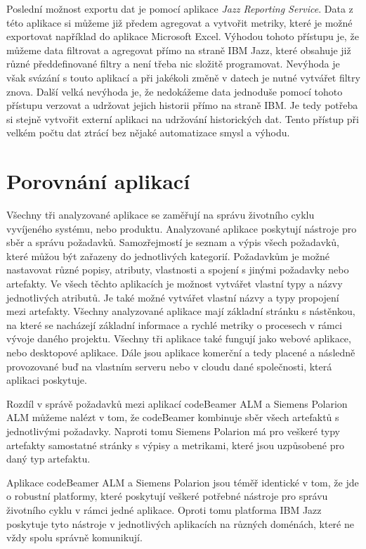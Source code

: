 \documentclass[czech,master]{diploma}
\begin{document}
Poslední možnost exportu dat je pomocí aplikace \textit{Jazz Reporting Service}. Data z této aplikace si můžeme již předem agregovat a vytvořit metriky, které je možné exportovat například do aplikace Microsoft Excel. Výhodou tohoto přístupu je, že můžeme data filtrovat a agregovat přímo na straně IBM Jazz, které obsahuje již různé předdefinované filtry a není třeba nic složitě programovat. Nevýhoda je však svázání s touto aplikací a při jakékoli změně v datech je nutné vytvářet filtry znova. Další velká nevýhoda je, že nedokážeme data jednoduše pomocí tohoto přístupu verzovat a udržovat jejich historii přímo na straně IBM. Je tedy potřeba si stejně vytvořit externí aplikaci na udržování historických dat. Tento přístup při velkém počtu dat ztrácí bez nějaké automatizace smysl a výhodu.

\section{Porovnání aplikací}
Všechny tři analyzované aplikace se zaměřují na správu životního cyklu vyvíjeného systému, nebo produktu. Analyzované aplikace poskytují nástroje pro sběr a správu požadavků. Samozřejmostí je seznam a výpis všech požadavků, které můžou být zařazeny do jednotlivých kategorií. Požadavkům je možné nastavovat různé popisy, atributy, vlastnosti a spojení s jinými požadavky nebo artefakty. Ve všech těchto aplikacích je možnost vytvářet vlastní typy a názvy jednotlivých atributů. Je také možné vytvářet vlastní názvy a typy propojení mezi artefakty. Všechny analyzované aplikace mají základní stránku s nástěnkou, na které se nacházejí základní informace a rychlé metriky o procesech v rámci vývoje daného projektu. Všechny tři aplikace také fungují jako webové aplikace, nebo desktopové aplikace. Dále jsou aplikace komerční a tedy placené a následně provozované buď na vlastním serveru nebo v cloudu dané společnosti, která aplikaci poskytuje.

Rozdíl v správě požadavků mezi aplikací codeBeamer ALM a Siemens Polarion ALM můžeme nalézt v tom, že codeBeamer kombinuje sběr všech artefaktů s jednotlivými požadavky. Naproti tomu Siemens Polarion má pro veškeré typy artefakty samostatné stránky s výpisy a metrikami, které jsou uzpůsobené pro daný typ artefaktu.

Aplikace codeBeamer ALM a Siemens Polarion jsou téměř identické v tom, že jde o robustní platformy, které poskytují veškeré potřebné nástroje pro správu životního cyklu v rámci jedné aplikace. Oproti tomu platforma IBM Jazz poskytuje tyto nástroje v jednotlivých aplikacích na různých doménách, které ne vždy spolu správně komunikují.
\end{document}
